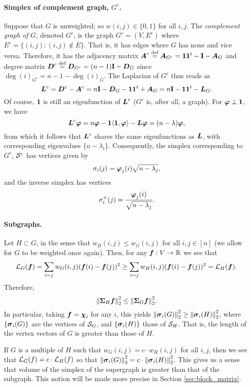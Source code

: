 \paragraph{Simplex of complement graph, $G^c$.}
Suppose that $G$ is unweighted; so $w(i,j)\in\{0,1\}$ for all $i,j$. The \emph{complement graph of $G$}, denoted $G^c$, 
is the graph $G^c=(V,E^c)$ where $E^c = \{(i,j):(i,j)\notin E\}$. That is, it has edges where $G$ has none and vice versa. Therefore, it has the adjacency matrix $\vb*{A}^c\overset{\text{def}}{=} \vb*{A}_{G^c}=\vb{1}\vb{1}^t - \vb{I}-\vb*{A}_G$ and degree matrix $\vb*{D}^c\overset{\text{def}}{=} \vb*{D}_{G^c}=(n-1)\vb{I}-\vb*{D}_G$ since $\deg(i)_{G^c}=n-1-\deg(i)_G$. The Laplacian of $G^c$ thus reads as 
\[\vb*{L}^c=\vb*{D}^c-\vb*{A}^c=n\vb{I}-\vb*{D}_G-\vb{1}\vb{1}^t+\vb*{A}_G=n\vb{I}-\vb{1}\vb{1}^t-\vb*{L}_G.\]
Of course, $\vb{1}$ is still an eigenfunction of $\vb*{L}^c$ ($G^c$ is, after all, a graph). For $\vb*{\varphi}\perp \vb{1}$, we have 
\[\vb*{L}^c\vb*{\varphi} = n\vb*{\varphi} - \vb{1}\langle \vb{1},\vb*{\varphi}\rangle - \vb*{L}\vb*{\varphi} = (n-\lambda)\vb*{\varphi},\]
from which it follows that $\vb*{L}^c$ shares the same eigenfunctions as $\vb*{L}$, with corresponding eigenvalues $\{n-\lambda_i\}$. Consequently, the simplex corresponding to $G^c$, $\mathcal{S}^c$ has vertices given by 
\[\sigma_i(j) = \vb*{\varphi}_j(i) \sqrt{n-\lambda_j},\]
and the inverse simplex has vertices 
\[\sigma_i^+(j)=\frac{\vb*{\varphi}_j(i)}{\sqrt{n-\lambda_j}}. \]



\paragraph{Subgraphs.}
Let $H\subset G$, in the sense that $w_H(i,j)\leq w_G(i,j)$ for all $i,j\in [n]$ (we allow for $G$ to be weighted once again). Then, for any $\vb*{f}:V\to\mathbb{R}$ we see that 
\[\mathcal{L}_G(\vb*{f})=\sum_{i\sim j}w_G(i,j)(\vb*{f}(i)-\vb*{f}(j))^2 \geq \sum_{i\sim j}w_H(i,j)(\vb*{f}(i)-\vb*{f}(j))^2 =\mathcal{L}_H(\vb*{f}).\]
Therefore, 
\begin{equation*}
\norm{\boldsymbol{\Sigma}_H \vb*{f}}_2^2 \leq \norm{\boldsymbol{\Sigma}_G \vb*{f}}_2^2. 
\end{equation*}
In particular, taking $\vb*{f}=\boldsymbol{\chi}_i$ for any $i$, this yields $\norm{\vb*{\sigma}_i(G)}_2^2\geq \norm{\vb*{\sigma}_i(H)}_2^2$, where $\{\vb*{\sigma}_i(G)\}$ are the vertices of $\mathcal{S}_G$, and $\{\vb*{\sigma}_i(H)\}$ those of $\mathcal{S}_H$. That is, the length of the vertex vectors of $G$ is greater than those of $H$. 

If $G$ is a multiple of $H$ such that $w_G(i,j)=c\cdot w_H(i,j)$ for all $i,j$, then we see that $\mathcal{L}_G(f)=c\cdot \mathcal{L}_H(f)$ so that $\norm{\vb*{\sigma}_i(G)}_2^2 =c\cdot \norm{\vb*{\sigma}_i(H)}_2^2$. This gives us a sense that volume of the simplex of the supergraph is greater than that of the subgraph. This notion will be made more precise in Section \ref{sec:block_matrix}. 

